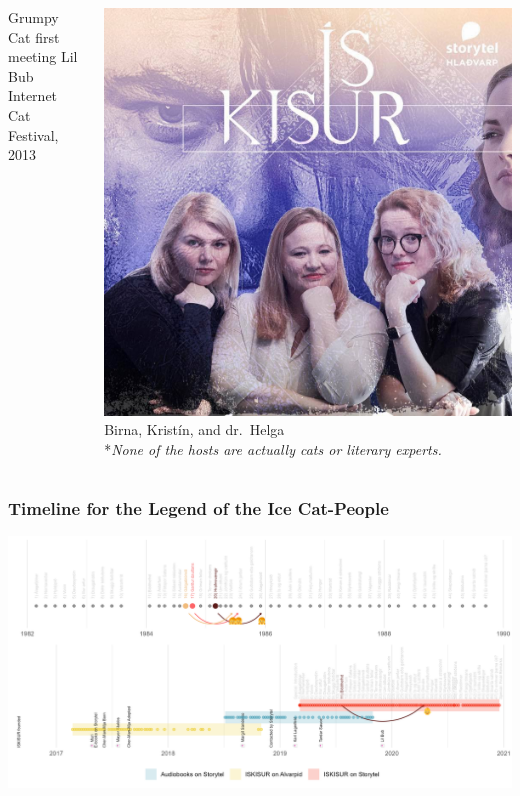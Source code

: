 \begin{frame}
\begin{columns}[T]
\begin{column}{0.55\textwidth}
            \scriptsize{Grumpy Cat first meeting Lil Bub\\Internet Cat Festival, 2013}
        \end{column}
        \begin{column}{0.45\textwidth}
            \centering
            \includegraphics[width=\textwidth]{../figures/podcast_image.jpg}
            \vfill
            Birna, Kristín, and dr.~Helga\\
            \vspace{12pt}
            \footnotesize{*\emph{None of the hosts are actually cats or literary experts.}}
        \end{column}
    \end{columns}
\end{frame}

\begin{frame}
    \frametitle{Timeline for the Legend of the Ice Cat-People}
    \includegraphics[width=\textwidth]{../R/figures/timeline}
\end{frame}
